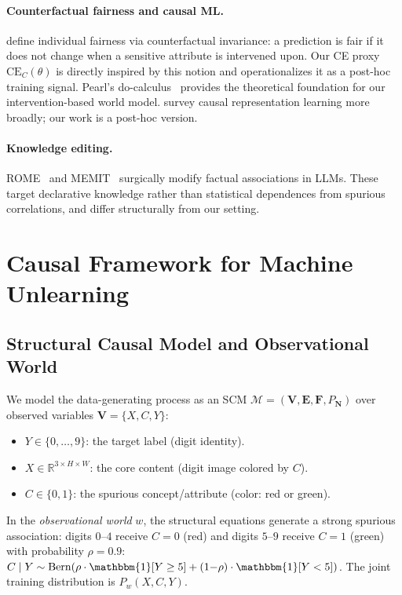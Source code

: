 \documentclass{article}
\newcommand{\CE}{\mathrm{CE}}
\newcommand{\Pw}{P_w}
\newcommand{\RR}{\mathbb{R}}
\begin{document}
\paragraph{Counterfactual fairness and causal ML.}
\citet{kusner2017counterfactual} define individual fairness via counterfactual
invariance: a prediction is fair if it does not change when a sensitive
attribute is intervened upon.  Our CE proxy $\CE_C(\theta)$ is directly
inspired by this notion and operationalizes it as a post-hoc training signal.
Pearl's do-calculus~\cite{pearl2009causality} provides the theoretical
foundation for our intervention-based world model.
\citet{scholkopf2021causal} survey causal representation learning more broadly;
our work is a post-hoc version.

\paragraph{Knowledge editing.}
ROME~\cite{meng2022rome} and MEMIT~\cite{meng2022memit} surgically modify
factual associations in LLMs.  These target declarative knowledge rather than
statistical dependences from spurious correlations, and differ structurally
from our setting.

\section{Causal Framework for Machine Unlearning}
\label{sec:framework}

\subsection{Structural Causal Model and Observational World}

We model the data-generating process as an SCM
$\mathcal{M} = (\mathbf{V}, \mathbf{E}, \mathbf{F}, P_\mathbf{N})$ over
observed variables $\mathbf{V} = \{X, C, Y\}$:
\begin{itemize}[leftmargin=1.5em]
  \item $Y \in \{0, \ldots, 9\}$: the target label (digit identity).
  \item $X \in \RR^{3 \times H \times W}$: the core content (digit image colored by $C$).
  \item $C \in \{0, 1\}$: the spurious concept/attribute (color: red or green).
\end{itemize}
In the \emph{observational world} $w$, the structural equations generate a
strong spurious association: digits $0$--$4$ receive $C=0$ (red) and digits
$5$--$9$ receive $C=1$ (green) with probability $\rho = 0.9$:
$C \mid Y \sim \mathrm{Bern}(\rho \cdot \mathbbm{1}[Y \geq 5]
+ (1{-}\rho) \cdot \mathbbm{1}[Y < 5])$.
The joint training distribution is $\Pw(X, C, Y)$.
\end{document}
